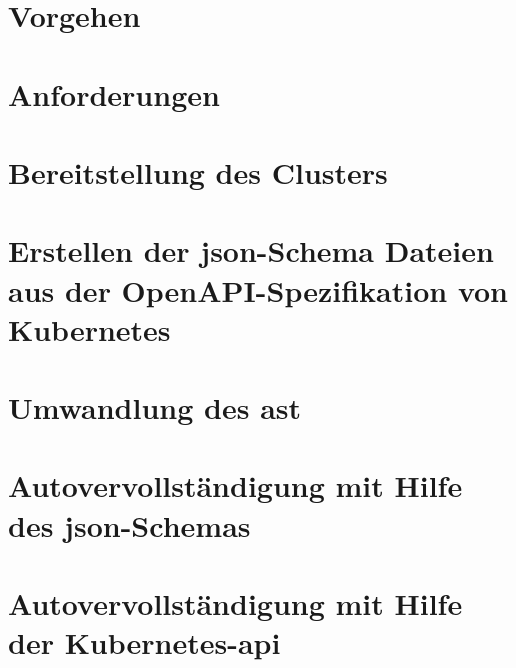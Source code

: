 \section{Vorgehen}

\section{Anforderungen}

\section{Bereitstellung des Clusters}

\section{Erstellen der \acs{json}-Schema Dateien aus der OpenAPI-Spezifikation von Kubernetes}

\section{Umwandlung des \acs{ast}}

\section{Autovervollständigung mit Hilfe des \acs{json}-Schemas}

\section{Autovervollständigung mit Hilfe der Kubernetes-\acs{api}}

